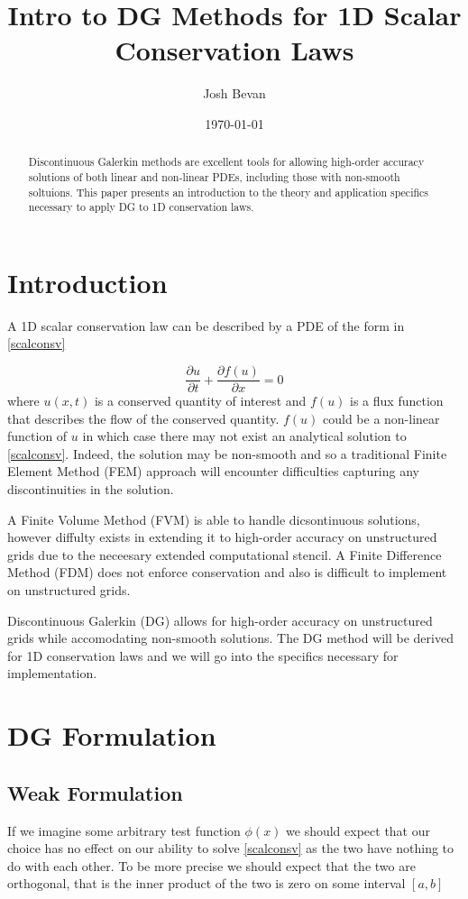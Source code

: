 \documentclass[letterpaper]{article}
\title{Intro to DG Methods for 1D Scalar Conservation Laws}
\author{Josh Bevan}
\date{\today}
\begin{document}
\maketitle
\begin{abstract}
Discontinuous Galerkin methods are excellent tools for allowing high-order accuracy solutions of both linear and non-linear PDEs, including those with non-smooth soltuions. This paper presents an introduction to the theory and application specifics necessary to apply DG to 1D conservation laws.
\end{abstract}

\section{Introduction}
A 1D scalar conservation law can be described by a PDE of the form in \eqref{scalconsv}

\begin{equation}\label{scalconsv}
\frac{\partial u}{\partial t} + \frac{\partial f(u)}{\partial x} = 0
\end{equation}
where $u(x,t)$ is a conserved quantity of interest and $f(u)$ is a flux function that describes the flow of the conserved quantity. $f(u)$ could be a non-linear function of $u$ in which case there may not exist an analytical solution to \eqref{scalconsv}. Indeed, the solution may be non-smooth and so a traditional Finite Element Method (FEM) approach will encounter difficulties capturing any discontinuities in the solution.

A Finite Volume Method (FVM) is able to handle dicsontinuous solutions, however diffulty exists in extending it to high-order accuracy on unstructured grids due to the neceesary extended computational stencil. A Finite Difference Method (FDM) does not enforce conservation and also is difficult to implement on unstructured grids.

Discontinuous Galerkin (DG) allows for high-order accuracy on unstructured grids while accomodating non-smooth solutions. The DG method will be derived for 1D conservation laws and we will go into the specifics necessary for implementation.

\section{DG Formulation}
\subsection{Weak Formulation}
If we imagine some arbitrary test function $\phi(x)$ we should expect that our choice has no effect on our ability to solve \eqref{scalconsv} as the two have nothing to do with each other. To be more precise we should expect that the two are orthogonal, that is the inner product of the two is zero on some interval $[a,b]$
\end{document}
